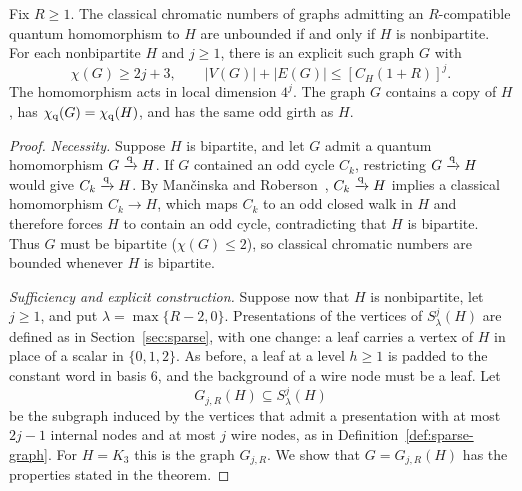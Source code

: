 \begin{theorem}\label{thm:fixed-target}
Fix $R\ge1$. The classical chromatic numbers of graphs admitting an $R$-compatible quantum homomorphism to $H$ are unbounded if and only if $H$ is nonbipartite. For each nonbipartite $H$ and $j\ge1$, there is an explicit such graph $G$ with
\[
 \chi(G)\ge2j+3,\qquad |V(G)|+|E(G)|\le[C_H(1+R)]^j.
\]
The homomorphism acts in local dimension $4^j$. The graph $G$ contains a copy of $H$, has $\chi_{\mathrm q}(G)=\chi_{\mathrm q}(H)$, and has the same odd girth as $H$.
\end{theorem}
\begin{proof}
\emph{Necessity.} Suppose $H$ is bipartite, and let $G$ admit a quantum homomorphism $G\xrightarrow{\mathrm q} H$. If $G$ contained an odd cycle $C_k$, restricting $G\xrightarrow{\mathrm q} H$ would give $C_k\xrightarrow{\mathrm q} H$. By Man{\v c}inska and Roberson~\cite[Theorem~4.12 of arXiv~v2]{MR}, $C_k\xrightarrow{\mathrm q} H$ implies a classical homomorphism $C_k\to H$, which maps $C_k$ to an odd closed walk in $H$ and therefore forces $H$ to contain an odd cycle, contradicting that $H$ is bipartite. Thus $G$ must be bipartite ($\chi(G)\le2$), so classical chromatic numbers are bounded whenever $H$ is bipartite.

\emph{Sufficiency and explicit construction.} Suppose now that $H$ is nonbipartite, let $j\ge1$, and put $\lambda=\max\{R-2,0\}$. Presentations of the vertices of $S^j_\lambda(H)$ are defined as in Section~\ref{sec:sparse}, with one change: a leaf carries a vertex of $H$ in place of a scalar in $\{0,1,2\}$. As before, a leaf at a level $h\ge1$ is padded to the constant word in basis $6$, and the background of a wire node must be a leaf. Let
\[
 G_{j,R}(H)\subseteq S^j_\lambda(H)
\]
be the subgraph induced by the vertices that admit a presentation with at most $2j-1$ internal nodes and at most $j$ wire nodes, as in Definition~\ref{def:sparse-graph}. For $H=K_3$ this is the graph $G_{j,R}$. We show that $G=G_{j,R}(H)$ has the properties stated in the theorem.


\end{proof}
